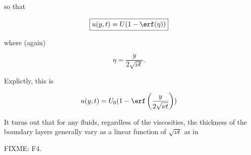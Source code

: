 so that 

\begin{equation}\label{eqn:continuumL16:590}
\boxed{
u(y, t) = U(1 - \erf(\eta))
}
\end{equation}

where (again)

\begin{equation}\label{eqn:continuumL16:610}
\eta = \frac{y}{2 \sqrt{\nu t}}.
\end{equation}

Explictly, this is

\begin{equation}\label{eqn:continuumL16:590}
u(y, t) = U_0(1 - \erf\left(\frac{y}{2 \sqrt{\nu t}}\right))
\end{equation}

It turns out that for any fluids, regardless of the viscosities, the thickness of the boundary layers generally vary as a linear function of $\sqrt{\nu t}$ as in

FIXME: F4.

\EndArticle
